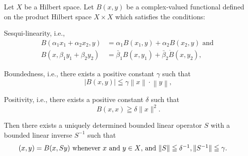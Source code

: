 \begin{theoremn} Let $X$ be a Hilbert space. Let $B(x, y)$ be a complex-valued functional defined on the product Hilbert space $X \times X$ which satisfies the conditions:

Sesqui-linearity, i.e., 
\begin{equation}\label{eq:III.7.1}
\begin{aligned}
B \left(\alpha_{1} x _{1} + \alpha_{2} x _{2}, y\right) &= \alpha_{1} B \left(x _{1}, y\right) + \alpha_{2} B \left(x _{2}, y\right) \text{ and }
\\
B \left(x, \beta_{1} y _{1} + \beta_{2} y _{2}\right) &= \bar {\beta} _{1} B \left(x, y _{1}\right) + \bar {\beta} _{2} \dot {B} \left(x, y _{2}\right),
\end{aligned}
\end{equation}

Boundedness, i.e., there exists a positive constant $\gamma$ such that 
\begin{equation}\label{eq:III.7.2}
\left| B (x, y) \right| \leqq \gamma \left\| x \right\| \cdot \left\| y \right\|,
\end{equation}

Positivity, i.e., there exists a positive constant $\delta$ such that 
\begin{equation}\label{eq:III.7.3}
B (x, x) \geqq \delta \| x \| ^{2}.
\end{equation}

Then there exists a uniquely determined bounded linear operator $S$ with a bounded linear inverse $S^{-1}$ such that 
\begin{equation}\label{eq:III.7.4}
\begin{minipage}[b]{0.92\linewidth}
$(x,y) = B(x,Sy)$ whenever $x$ and $y\in X$, and $\| S\| \leqq \delta^{-1},\| S^{-1}\| \leqq \gamma$.
\end{minipage}
\end{equation}


\end{theoremn}

